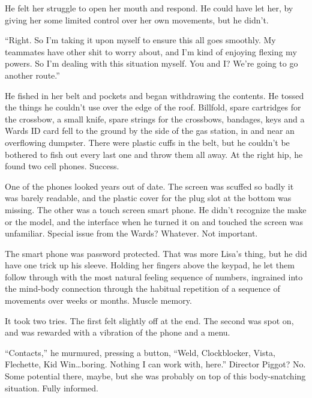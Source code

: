He felt her struggle to open her mouth and respond.  He could have let her, by giving her some limited control over her own movements, but he didn't.



``Right.  So I'm taking it upon myself to ensure this all goes smoothly.  My teammates have other shit to worry about, and I'm kind of enjoying flexing my powers.  So I'm dealing with this situation myself.  You and I?  We're going to go another route.''



He fished in her belt and pockets and began withdrawing the contents.  He tossed the things he couldn't use over the edge of the roof.  Billfold, spare cartridges for the crossbow, a small knife, spare strings for the crossbows, bandages, keys and a Wards ID card fell to the ground by the side of the gas station, in and near an overflowing dumpster.  There were plastic cuffs in the belt, but he couldn't be bothered to fish out every last one and throw them all away.  At the right hip, he found two cell phones.  Success.



One of the phones looked years out of date.  The screen was scuffed so badly it was barely readable, and the plastic cover for the plug slot at the bottom was missing.  The other was a touch screen smart phone.  He didn't recognize the make or the model, and the interface when he turned it on and touched the screen was unfamiliar.  Special issue from the Wards?  Whatever.  Not important.



The smart phone was password protected.  That was more Lisa's thing, but he did have one trick up his sleeve.  Holding her fingers above the keypad, he let them follow through with the most natural feeling sequence of numbers, ingrained into the mind-body connection through the habitual repetition of a sequence of movements over weeks or months.  Muscle memory.



It took two tries.  The first felt slightly off at the end.  The second was spot on, and was rewarded with a vibration of the phone and a menu.



``Contacts,'' he murmured, pressing a button, ``Weld, Clockblocker, Vista, Flechette, Kid Win\ldots boring.  Nothing I can work with, here.''  Director Piggot?  No.  Some potential there, maybe, but she was probably on top of this body-snatching situation.  Fully informed.



